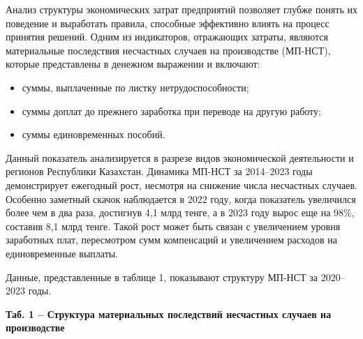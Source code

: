 Анализ структуры экономических затрат предприятий позволяет глубже
понять их поведение и выработать правила, способные эффективно влиять на
процесс принятия решений. Одним из индикаторов, отражающих затраты,
являются материальные последствия несчастных случаев на производстве
(МП-НСТ), которые представлены в денежном выражении и включают:

\begin{itemize}
\item
  суммы, выплаченные по листку нетрудоспособности;
\item
  суммы доплат до прежнего заработка при переводе на другую работу;
\item
  суммы единовременных пособий.
\end{itemize}

Данный показатель анализируется в разрезе видов экономической
деятельности и регионов Республики Казахстан. Динамика МП-НСТ за
2014--2023 годы демонстрирует ежегодный рост, несмотря на снижение числа
несчастных случаев. Особенно заметный скачок наблюдается в 2022 году,
когда показатель увеличился более чем в два раза, достигнув 4,1 млрд
тенге, а в 2023 году вырос еще на 98\%, составив 8,1 млрд тенге. Такой
рост может быть связан с увеличением уровня заработных плат, пересмотром
сумм компенсаций и увеличением расходов на единовременные выплаты.

Данные, представленные в таблице 1, показывают структуру МП-НСТ за
2020--2023 годы.

{\bfseries Таб. 1 -- Структура материальных последствий несчастных случаев
на производстве}

